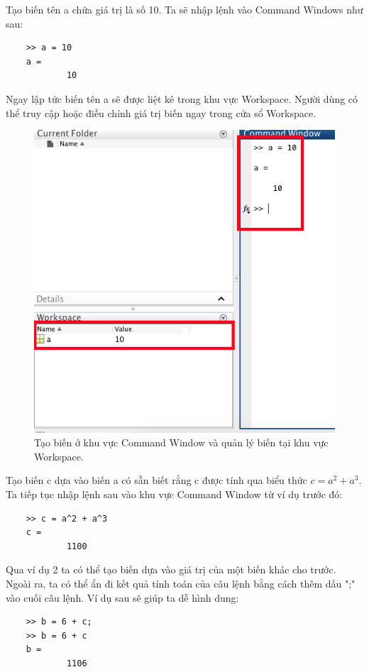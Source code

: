 \documentclass[12pt,a4paper]{article}
\begin{document}
\begin{example}
\normalfont
Tạo biến tên a chứa giá trị là số 10. Ta sẽ nhập lệnh vào Command Windows như sau:
\begin{lstlisting}
	>> a = 10
	a =
    		10
\end{lstlisting}
Ngay lập tức biến tên a sẽ được liệt kê trong khu vực Workspace. Người dùng có thể truy cập hoặc điều chỉnh giá trị biến ngay trong cửa sổ Workspace.\\
\begin{center}
	\begin{figure}[htp]
		\begin{center}
		\includegraphics[scale=.5]{hinhtieuluan/pic4}
		\end{center}
		\caption{Tạo biến ở khu vực Command Window và quản lý biến tại khu vực Workspace.}
		\label{refhinh4}
	\end{figure}
\end{center}
\end{example}
\begin{example}
\normalfont Tạo biến c dựa vào biến a có sẵn biết rằng c được tính qua biểu thức $c=a^2+a^3$. Ta tiếp tục nhập lệnh sau vào khu vực Command Window từ ví dụ trước đó:
\begin{lstlisting}
	>> c = a^2 + a^3
	c =
        	1100
\end{lstlisting}
Qua ví dụ 2 ta có thể tạo biến dựa vào giá trị của một biến khác cho trước. Ngoài ra, ta có thể ẩn đi kết quả tính toán của câu lệnh bằng cách thêm dấu ";" vào cuối câu lệnh. Ví dụ sau sẽ giúp ta dễ hình dung:
\begin{lstlisting}
	>> b = 6 + c;
	>> b = 6 + c
	b =
        	1106
\end{lstlisting}
\end{example}
\end{document}
